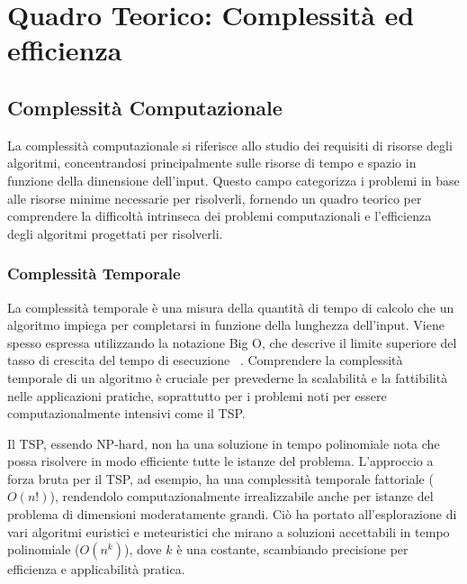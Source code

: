 
%

\chapter{Quadro Teorico: Complessità ed efficienza}\label{chapt:2}



\section{Complessità Computazionale}

La complessità computazionale si riferisce allo studio dei requisiti di risorse degli algoritmi, concentrandosi principalmente sulle risorse di tempo e spazio in funzione della dimensione dell'input. Questo campo categorizza i problemi in base alle risorse minime necessarie per risolverli, fornendo un quadro teorico per comprendere la difficoltà intrinseca dei problemi computazionali e l'efficienza degli algoritmi progettati per risolverli. ~\cite{GareyJohnson1979}

\subsection{Complessità Temporale}

La complessità temporale è una misura della quantità di tempo di calcolo che un algoritmo impiega per completarsi in funzione della lunghezza dell'input. Viene spesso espressa utilizzando la notazione Big O, che descrive il limite superiore del tasso di crescita del tempo di esecuzione ~\cite{BigONotation}. Comprendere la complessità temporale di un algoritmo è cruciale per prevederne la scalabilità e la fattibilità nelle applicazioni pratiche, soprattutto per i problemi noti per essere computazionalmente intensivi come il \gls{TSP}. 

Il \gls{TSP}, essendo \gls{NP}-hard, non ha una soluzione in tempo polinomiale nota che possa risolvere in modo efficiente tutte le istanze del problema. L'approccio a forza bruta per il \gls{TSP}, ad esempio, ha una complessità temporale fattoriale (\(O(n!)\)), rendendolo computazionalmente irrealizzabile anche per istanze del problema di dimensioni moderatamente grandi. Ciò ha portato all'esplorazione di vari algoritmi euristici e meteuristici che mirano a soluzioni accettabili in tempo polinomiale (\(O(n^k)\)), dove \(k\) è una costante, scambiando precisione per efficienza e applicabilità pratica.~\cite{Dorigo1996}


